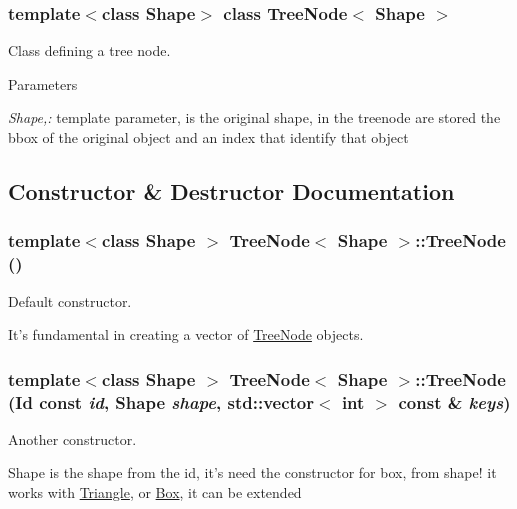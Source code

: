 \subsubsection*{template$<$class Shape$>$ class TreeNode$<$ Shape $>$}

Class defining a tree node. 
\begin{DoxyParams}{Parameters}
\item[{\em Shape,:}]template parameter, is the original shape, in the treenode are stored the bbox of the original object and an index that identify that object \end{DoxyParams}


\subsection{Constructor \& Destructor Documentation}
\hypertarget{classTreeNode_a0b76dda42f063815700904c6861055b2}{
\subsubsection[{TreeNode}]{\setlength{\rightskip}{0pt plus 5cm}template$<$class Shape $>$ {\bf TreeNode}$<$ Shape $>$::{\bf TreeNode} ()}}
\label{classTreeNode_a0b76dda42f063815700904c6861055b2}
Default constructor.

It's fundamental in creating a vector of \hyperlink{classTreeNode}{TreeNode} objects. \hypertarget{classTreeNode_a8fc5141645c0a2131e3d4148da085165}{
\subsubsection[{TreeNode}]{\setlength{\rightskip}{0pt plus 5cm}template$<$class Shape $>$ {\bf TreeNode}$<$ Shape $>$::{\bf TreeNode} (Id const  {\em id}, \/  Shape {\em shape}, \/  std::vector$<$ int $>$ const \& {\em keys})}}
\label{classTreeNode_a8fc5141645c0a2131e3d4148da085165}
Another constructor.

Shape is the shape from the id, it's need the constructor for box, from shape! it works with \hyperlink{classTriangle}{Triangle}, or \hyperlink{classBox}{Box}, it can be extended 

